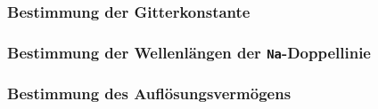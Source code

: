 \documentclass[a4paper, 11pt]{article}
\begin{document}
\subsubsection{Bestimmung der Gitterkonstante}


\subsubsection{Bestimmung der Wellenlängen der \texttt{Na}-Doppellinie}


\subsubsection{Bestimmung des Auflösungsvermögens}






\newpage
\listoffigures
\listoftables
\end{document}
